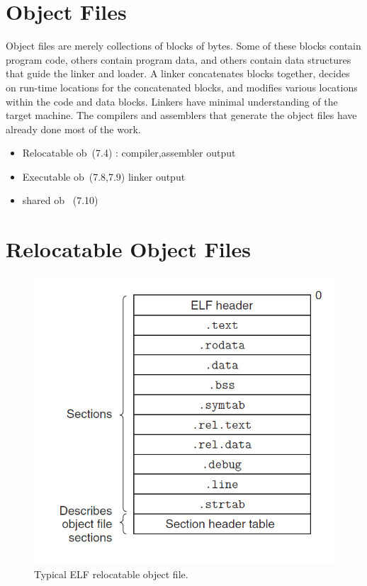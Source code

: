 \section{Object Files}

Object files are merely collections of blocks
of bytes. Some of these blocks contain program code, others contain program
data, and others contain data structures that guide the linker and loader. A linker
concatenates blocks together, decides on run-time locations for the concatenated
blocks, and modifies various locations within the code and data blocks. Linkers
have minimal understanding of the target machine. The compilers and assemblers
that generate the object files have already done most of the work.


\begin{itemize}
    \item Relocatable ob~(7.4) : compiler,assembler output
    \item Executable ob~(7.8,7.9) linker output
    \item shared ob~ (7.10)
\end{itemize}



\section{Relocatable Object Files}


\begin{figure}[h!]
    \centering
    \includegraphics[scale=0.5]{pic/section7/pic2.png}
    \caption{Typical ELF relocatable object file.}
\end{figure}

